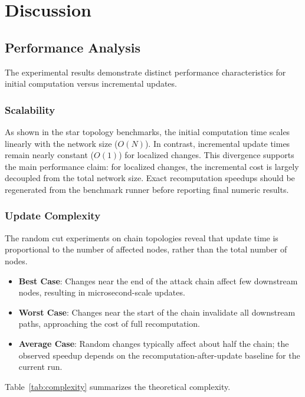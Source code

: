 \documentclass[conference]{IEEEtran}
\begin{document}
\section{Discussion}

\subsection{Performance Analysis}

The experimental results demonstrate distinct performance characteristics for initial computation versus incremental updates.

\subsubsection{Scalability}
As shown in the star topology benchmarks, the initial computation time scales linearly with the network size ($O(N)$). In contrast, incremental update times remain nearly constant ($O(1)$) for localized changes. This divergence supports the main performance claim: for localized changes, the incremental cost is largely decoupled from the total network size. Exact recomputation speedups should be regenerated from the benchmark runner before reporting final numeric results.

\subsubsection{Update Complexity}
The random cut experiments on chain topologies reveal that update time is proportional to the number of affected nodes, rather than the total number of nodes.
\begin{itemize}
    \item \textbf{Best Case}: Changes near the end of the attack chain affect few downstream nodes, resulting in microsecond-scale updates.
    \item \textbf{Worst Case}: Changes near the start of the chain invalidate all downstream paths, approaching the cost of full recomputation.
    \item \textbf{Average Case}: Random changes typically affect about half the
    chain; the observed speedup depends on the recomputation-after-update
    baseline for the current run.
\end{itemize}

Table~\ref{tab:complexity} summarizes the theoretical complexity.
\end{document}
